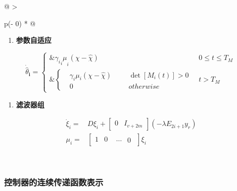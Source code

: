 \documentclass[
  12pt,
  a4paper
]{article}
\begin{document}
\begin{longtable}[]{@{}
  >{\raggedright\arraybackslash}p{}@{}}
\begin{minipage}[t]{\linewidth}
\begin{enumerate}
\def\labelenumi{\arabic{enumi}.}
\setcounter{enumi}{1}
\item
  \textbf{参数自适应}
\end{enumerate}

\[{\dot{\widehat{\theta}}}_{\mathbf{i}}\mathbf{=}\left\{ \begin{aligned}
\mathbf{\&}{{\gamma_{i}}_{i}\mu}_{i}\left( \chi - \widehat{\chi} \right) & 0 \leq t \leq T_{M} \\
\mathbf{\&}\left\{ \begin{array}{rlrlr}
 & \gamma_{i}\mu_{i}\left( \chi - \widehat{\chi} \right) & & & \det\left\lbrack M_{i}(t) \right\rbrack > 0 \\
 & 0 & & & otherwise
\end{array} \right.\  & t > T_{M}
\end{aligned} \right.\ \]

\begin{enumerate}
\def\labelenumi{\arabic{enumi}.}
\setcounter{enumi}{2}
\item
  \textbf{滤波器组}
\end{enumerate}

\[\begin{aligned}
{\dot{\xi}}_{i} = & D\xi_{i} + \begin{bmatrix}
0 & I_{v + 2m}
\end{bmatrix}( - \lambda E_{2i + 1}y_{r}) \\
\mu_{i} = & \begin{bmatrix}
1 & 0 & \begin{matrix}
\cdots & 0
\end{matrix}
\end{bmatrix}\xi_{i}
\end{aligned}\]
\end{minipage} \\
\end{longtable}

\subsubsection{控制器的连续传递函数表示}\label{ux63a7ux5236ux5668ux7684ux8fdeux7eedux4f20ux9012ux51fdux6570ux8868ux793a}
\end{document}

